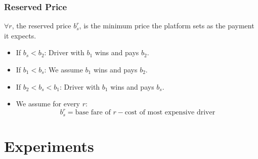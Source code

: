 \documentclass[t]{beamer}
\begin{document}
\begin{frame}\frametitle{Reserved Price}
\begin{block}{}
$\forall r$, the reserved price $b_s^r$, is the minimum price the platform sets as the payment it expects. 
\end{block}
\begin{itemize}
\item<2-> If $b_s < b_2$: Driver with $b_1$ wins and pays $b_2$.
\item<3-> If $b_1 < b_s$: We assume $b_1$ wins and pays $b_2$.
\item<4-> If $b_2 < b_s < b_1$: Driver with $b_1$ wins and pays $b_s$.
\end{itemize}
\begin{itemize}
\item<5-> We assume for every $r$:
\begin{equation*}
b_s^r = \text{base fare of }r - \text{cost of most expensive driver}
\end{equation*}
\end{itemize}
\end{frame}

\section{Experiments}
\end{document}
